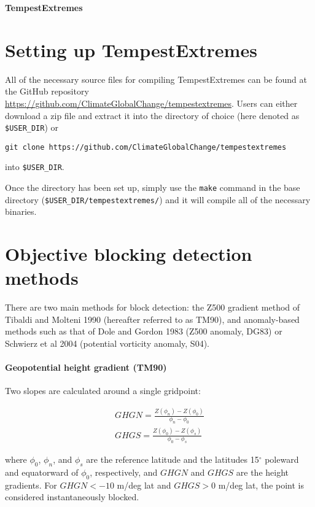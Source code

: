 \documentclass{article}
\begin{document}
{\Huge \textbf{TempestExtremes}}


\tableofcontents

\section{Setting up TempestExtremes}

All of the necessary source files for compiling TempestExtremes can be found at the GitHub repository \url{https://github.com/ClimateGlobalChange/tempestextremes}. Users can either download a zip file and extract it into the directory of choice (here denoted as \texttt{\$USER\_DIR}) or 

\texttt{git clone https://github.com/ClimateGlobalChange/tempestextremes} 

into \texttt{\$USER\_DIR}.

Once the directory has been set up, simply use the \texttt{make} command in the base directory (\texttt{\$USER\_DIR/tempestextremes/}) and it will compile all of the necessary binaries.

\section{Objective blocking detection methods}

There are two main methods for block detection: the Z500 gradient method of Tibaldi and Molteni 1990 (hereafter referred to as TM90), and anomaly-based methods such as that of Dole and Gordon 1983 (Z500 anomaly, DG83) or Schwierz et al 2004 (potential vorticity anomaly, S04). 

\paragraph{Geopotential height gradient (TM90)} Two slopes are calculated around a single gridpoint:

\begin{eqnarray}
GHGN=\frac{Z(\phi_n)-Z(\phi_0)}{\phi_n-\phi_0}\\
GHGS=\frac{Z(\phi_0)-Z(\phi_s)}{\phi_0-\phi_s}
\end{eqnarray}

\noindent where $\phi_0$, $\phi_n$, and $\phi_s$ are the reference latitude and the latitudes 15$^\circ$ poleward and equatorward of $\phi_0$, respectively, and $GHGN$ and $GHGS$ are the height gradients. For $GHGN<-10$ m/deg lat and $GHGS>0$ m/deg lat, the point is considered instantaneously blocked.
\end{document}
